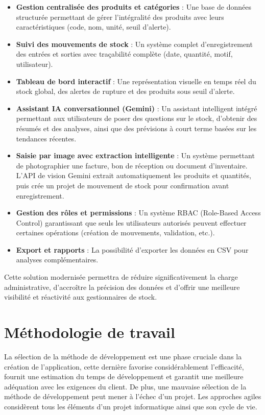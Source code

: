 \begin{itemize}[label=—]
    \item \textbf{Gestion centralisée des produits et catégories} : Une base de données structurée permettant de gérer l'intégralité des produits avec leurs caractéristiques (code, nom, unité, seuil d'alerte).

    \item \textbf{Suivi des mouvements de stock} : Un système complet d'enregistrement des entrées et sorties avec traçabilité complète (date, quantité, motif, utilisateur).

    \item \textbf{Tableau de bord interactif} : Une représentation visuelle en temps réel du stock global, des alertes de rupture et des produits sous seuil d'alerte.

    \item \textbf{Assistant IA conversationnel (Gemini)} : Un assistant intelligent intégré permettant aux utilisateurs de poser des questions sur le stock, d'obtenir des résumés et des analyses, ainsi que des prévisions à court terme basées sur les tendances récentes.

    \item \textbf{Saisie par image avec extraction intelligente} : Un système permettant de photographier une facture, bon de réception ou document d'inventaire. L'API de vision Gemini extrait automatiquement les produits et quantités, puis crée un projet de mouvement de stock pour confirmation avant enregistrement.

    \item \textbf{Gestion des rôles et permissions} : Un système RBAC (Role-Based Access Control) garantissant que seuls les utilisateurs autorisés peuvent effectuer certaines opérations (création de mouvements, validation, etc.).

    \item \textbf{Export et rapports} : La possibilité d'exporter les données en CSV pour analyses complémentaires.
\end{itemize}

Cette solution modernisée permettra de réduire significativement la charge administrative, d'accroître la précision des données et d'offrir une meilleure visibilité et réactivité aux gestionnaires de stock.

\section{Méthodologie de travail }
La sélection de la méthode de développement est une phase cruciale dans la création de l'application, cette dernière favorise considérablement l'efficacité, fournit une estimation du temps de développement et garantit une meilleure adéquation avec les exigences du client. De plus, une mauvaise sélection de la méthode de développement peut mener à l'échec d'un projet. Les approches agiles considèrent tous les éléments d'un projet informatique ainsi que son cycle de vie. 

